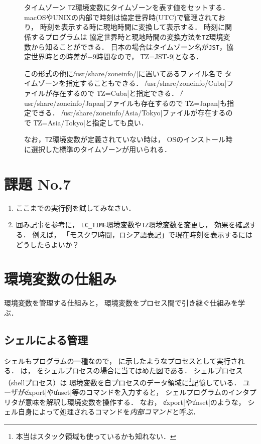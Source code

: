 \begin{figure}[btp]
\begin{itembox}[l]{タイムゾーン}
\texttt{TZ}環境変数にタイムゾーンを表す値をセットする．
macOSやUNIXの内部で時刻は協定世界時(UTC)で管理されており，
時刻を表示する時に現地時間に変換して表示する．
時刻に関係するプログラムは
協定世界時と現地時間の変換方法を\texttt{TZ}環境変数から知ることができる．
日本の場合はタイムゾーン名が\texttt{JST}，協定世界時との時差が$-9$時間なので，
\|TZ=JST-9|となる．

この形式の他に\|/usr/share/zoneinfo/|に置いてあるファイル名で
タイムゾーンを指定することもできる．
\|/usr/share/zoneinfo/Cuba|ファイルが存在するので
\|TZ=Cuba|と指定できる．
\|/usr/share/zoneinfo/Japan|ファイルも存在するので
\|TZ=Japan|も指定できる．
\|/usr/share/zoneinfo/Asia/Tokyo|ファイルが存在するので
\|TZ=Asia/Tokyo|と指定しても良い．

なお，\texttt{TZ}環境変数が定義されていない時は，
OSのインストール時に選択した標準のタイムゾーンが用いられる．
\end{itembox}
\end{figure}

\newpage

\section*{課題 No.7}
\begin{enumerate}
\item ここまでの実行例を試してみなさい．
\item 囲み記事を参考に，
  \texttt{LC\_TIME}環境変数や\texttt{TZ}環境変数を変更し，
  効果を確認する．
  例えば，
  「モスクワ時間，ロシア語表記」で現在時刻を表示するにはどうしたらよいか？
\end{enumerate}
\newpage
\section{環境変数の仕組み}
環境変数を管理する仕組みと，
環境変数をプロセス間で引き継ぐ仕組みを学ぶ．

\subsection{シェルによる管理}
シェルもプログラムの一種なので，
に示したようなプロセスとして実行される．
は，
をシェルプロセスの場合に当てはめた図である．
シェルプロセス（shellプロセス）は
環境変数を自プロセスのデータ領域に\footnote{
本当はスタック領域も使っているかも知れない．}記憶している．
ユーザが\|export|や\|unset|等のコマンドを入力すると，
シェルプログラムのインタプリタが意味を解釈し環境変数を操作する．
なお，
\|export|や\|unset|のような，
シェル自身によって処理されるコマンドを\emph{内部コマンド}と呼ぶ．

